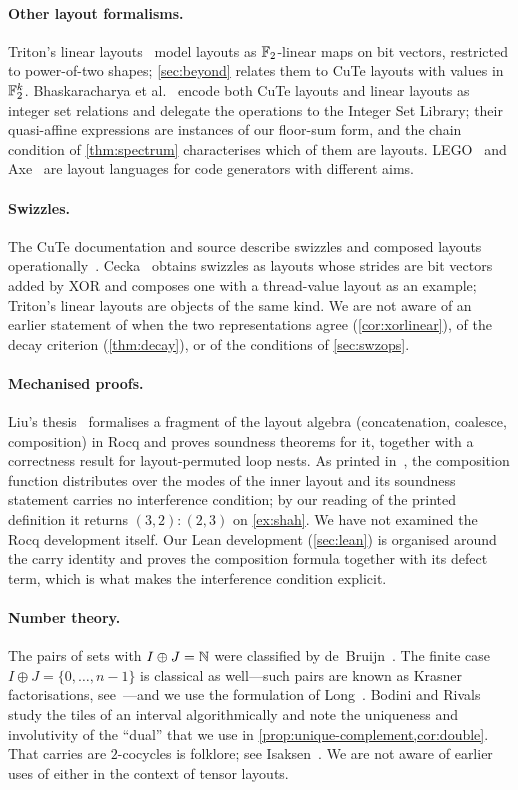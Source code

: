 \paragraph{Other layout formalisms.}
Triton's linear layouts~\cite{zhou2026} model layouts as $\mathbb{F}_2$-linear maps on bit vectors,
restricted to power-of-two shapes; \cref{sec:beyond} relates them to CuTe layouts with values in
$\mathbb{F}_2^k$. Bhaskaracharya et al.~\cite{bhaskaracharya2025} encode both CuTe layouts and linear
layouts as integer set relations and delegate the operations to the Integer Set Library; their
quasi-affine expressions are instances of our floor-sum form, and the chain condition of
\cref{thm:spectrum} characterises which of them are layouts. LEGO~\cite{tavakkoli2025} and
Axe~\cite{hou2026} are layout languages for code generators with different aims.

\paragraph{Swizzles.}
The CuTe documentation and source describe swizzles and composed layouts
operationally~\cite{cutedocs}. Cecka~\cite{cecka2026} obtains swizzles as layouts whose strides
are bit vectors added by XOR and composes one with a thread-value layout as an example; Triton's
linear layouts are objects of the same kind. We are not aware of an earlier statement of when the two
representations agree (\cref{cor:xorlinear}), of the decay criterion (\cref{thm:decay}), or of
the conditions of \cref{sec:swzops}.

\paragraph{Mechanised proofs.}
Liu's thesis~\cite{liu2026} formalises a fragment of the layout algebra (concatenation, coalesce,
composition) in Rocq and proves soundness theorems for it, together with a correctness result for
layout-permuted loop nests. As printed in~\cite[\S6.4.3]{liu2026}, the composition function
distributes over the modes of the inner layout and its soundness statement carries no
interference condition; by our reading of the printed definition it returns $(3,2):(2,3)$ on
\cref{ex:shah}. We have not examined the Rocq development itself.
Our Lean development (\cref{sec:lean}) is organised around the carry identity and proves the
composition formula together with its defect term, which is what makes the interference condition
explicit.

\paragraph{Number theory.}
The pairs of sets with $I\oplus J=\mathbb{N}$ were classified by de~Bruijn~\cite{debruijn1956}. The
finite case $I\oplus J=\{0,\dots,n-1\}$ is classical as well---such pairs are known as Krasner
factorisations, see~\cite{bodini2006}---and we use the formulation of Long~\cite{long1967}.
Bodini and Rivals~\cite{bodini2006} study the tiles of an interval algorithmically and note the uniqueness and involutivity of the ``dual'' that we use in
\cref{prop:unique-complement,cor:double}. That carries are $2$-cocycles is folklore; see Isaksen~\cite{isaksen2002}.
We are not aware of earlier uses of either in the context of tensor layouts.
